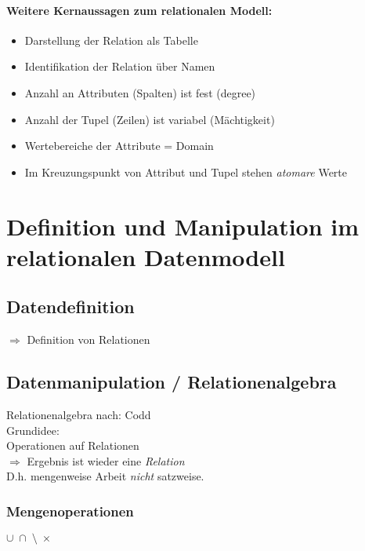 \paragraph{Weitere Kernaussagen zum relationalen Modell:}
\begin{itemize}
\item Darstellung der Relation als Tabelle
\item Identifikation der Relation über Namen
\item Anzahl an Attributen (Spalten) ist fest (degree)
\item Anzahl der Tupel (Zeilen) ist variabel (Mächtigkeit)
\item Wertebereiche der Attribute = Domain
\item Im Kreuzungspunkt von Attribut und Tupel stehen \emph{atomare} Werte
\end{itemize}
\section{Definition und Manipulation im relationalen Datenmodell}
\subsection{Datendefinition}
$\Rightarrow$ Definition von Relationen
\subsection{Datenmanipulation / Relationenalgebra}
Relationenalgebra nach: Codd\\
Grundidee:\\
Operationen auf Relationen\\
$\Rightarrow$ Ergebnis ist wieder eine \emph{Relation}\\
D.h. mengenweise Arbeit \emph{nicht} satzweise.
\subsubsection{Mengenoperationen} $\cup\; \cap\; \setminus\; \times$\\
 \qquad
{}
